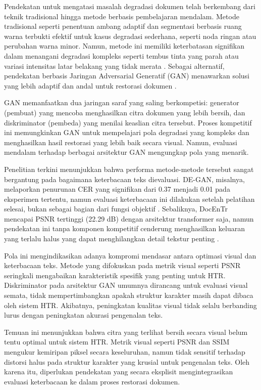 Pendekatan untuk mengatasi masalah degradasi dokumen telah berkembang dari teknik tradisional hingga metode berbasis pembelajaran mendalam. Metode tradisional seperti penentuan ambang adaptif \parencite{sauvola2000, otsu1979} dan segmentasi berbasis ruang warna terbukti efektif untuk kasus degradasi sederhana, seperti noda ringan atau perubahan warna minor. Namun, metode ini memiliki keterbatasan signifikan dalam menangani degradasi kompleks seperti tembus tinta yang parah atau variasi intensitas latar belakang yang tidak merata \parencite{souibgui2021degan}. Sebagai alternatif, pendekatan berbasis Jaringan Adversarial Generatif (GAN) menawarkan solusi yang lebih adaptif dan andal untuk restorasi dokumen \parencite{goodfellow2014}.


GAN memanfaatkan dua jaringan saraf yang saling berkompetisi: generator (pembuat) yang mencoba menghasilkan citra dokumen yang lebih bersih, dan diskriminator (pembeda) yang menilai keaslian citra tersebut. Proses kompetitif ini memungkinkan GAN untuk mempelajari pola degradasi yang kompleks dan menghasilkan hasil restorasi yang lebih baik secara visual. Namun, evaluasi mendalam terhadap berbagai arsitektur GAN mengungkap pola yang menarik.


Penelitian terkini menunjukkan bahwa performa metode-metode tersebut sangat bergantung pada bagaimana keterbacaan teks dievaluasi. DE-GAN, misalnya, melaporkan penurunan CER yang signifikan dari 0.37 menjadi 0.01 pada eksperimen tertentu, namun evaluasi keterbacaan ini dilakukan setelah pelatihan selesai, bukan sebagai bagian dari fungsi objektif \parencite{souibgui2021degan}. Sebaliknya, DocEnTr mencapai PSNR tertinggi (22.29 dB) dengan arsitektur transformer saja, namun pendekatan ini tanpa komponen kompetitif cenderung menghasilkan keluaran yang terlalu halus yang dapat menghilangkan detail tekstur penting \parencite{docentr2022}.


Pola ini mengindikasikan adanya kompromi mendasar antara optimasi visual dan keterbacaan teks. Metode yang difokuskan pada metrik visual seperti PSNR seringkali mengabaikan karakteristik spesifik yang penting untuk HTR. Diskriminator pada arsitektur GAN umumnya dirancang untuk evaluasi visual semata, tidak mempertimbangkan apakah struktur karakter masih dapat dibaca oleh sistem HTR. Akibatnya, peningkatan kualitas visual tidak selalu berbanding lurus dengan peningkatan akurasi pengenalan teks.


Temuan ini menunjukkan bahwa citra yang terlihat bersih secara visual belum tentu optimal untuk sistem HTR. Metrik visual seperti PSNR dan SSIM mengukur kemiripan piksel secara keseluruhan, namun tidak sensitif terhadap distorsi halus pada struktur karakter yang krusial untuk pengenalan teks. Oleh karena itu, diperlukan pendekatan yang secara eksplisit mengintegrasikan evaluasi keterbacaan ke dalam proses restorasi dokumen.


